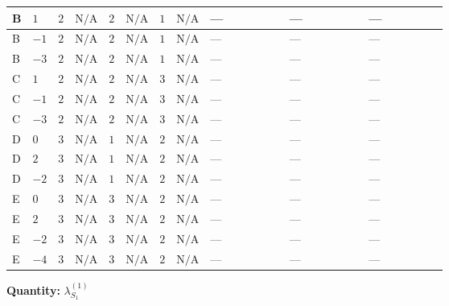 \documentclass[8pt]{article}
\begin{document}
\begin{landscape}
\begin{longtable}{@{}llcccccc >{\raggedright\arraybackslash}p{0.21\linewidth} >{\raggedright\arraybackslash}p{0.21\linewidth} >{\raggedright\arraybackslash}p{0.21\linewidth}@{}}
\midrule
B & $1$ & $2$ & $\text{N/A}$ & $2$ & $\text{N/A}$ & $1$ & $\text{N/A}$ & --- & --- & --- \\
\midrule
B & $-1$ & $2$ & $\text{N/A}$ & $2$ & $\text{N/A}$ & $1$ & $\text{N/A}$ & --- & --- & --- \\
\midrule
B & $-3$ & $2$ & $\text{N/A}$ & $2$ & $\text{N/A}$ & $1$ & $\text{N/A}$ & --- & --- & --- \\
\midrule
C & $1$ & $2$ & $\text{N/A}$ & $2$ & $\text{N/A}$ & $3$ & $\text{N/A}$ & --- & --- & --- \\
\midrule
C & $-1$ & $2$ & $\text{N/A}$ & $2$ & $\text{N/A}$ & $3$ & $\text{N/A}$ & --- & --- & --- \\
\midrule
C & $-3$ & $2$ & $\text{N/A}$ & $2$ & $\text{N/A}$ & $3$ & $\text{N/A}$ & --- & --- & --- \\
\midrule
D & $0$ & $3$ & $\text{N/A}$ & $1$ & $\text{N/A}$ & $2$ & $\text{N/A}$ & --- & --- & --- \\
\midrule
D & $2$ & $3$ & $\text{N/A}$ & $1$ & $\text{N/A}$ & $2$ & $\text{N/A}$ & --- & --- & --- \\
\midrule
D & $-2$ & $3$ & $\text{N/A}$ & $1$ & $\text{N/A}$ & $2$ & $\text{N/A}$ & --- & --- & --- \\
\midrule
E & $0$ & $3$ & $\text{N/A}$ & $3$ & $\text{N/A}$ & $2$ & $\text{N/A}$ & --- & --- & --- \\
\midrule
E & $2$ & $3$ & $\text{N/A}$ & $3$ & $\text{N/A}$ & $2$ & $\text{N/A}$ & --- & --- & --- \\
\midrule
E & $-2$ & $3$ & $\text{N/A}$ & $3$ & $\text{N/A}$ & $2$ & $\text{N/A}$ & --- & --- & --- \\
\midrule
E & $-4$ & $3$ & $\text{N/A}$ & $3$ & $\text{N/A}$ & $2$ & $\text{N/A}$ & --- & --- & --- \\
\midrule
\bottomrule
\end{longtable}
\clearpage
\noindent\textbf{Quantity: }$\lambda_{S_1}^{(1)}$\par\smallskip

\end{landscape}
\end{document}
